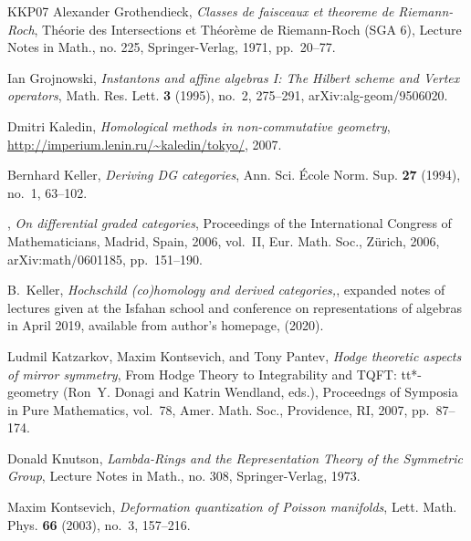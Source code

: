 \documentclass[12pt,a4paper,reqno]{amsart}
\begin{document}
\begin{thebibliography}{KKP07}
Alexander Grothendieck, \emph{Classes de faisceaux et theoreme de
  {R}iemann-{R}och}, Th{\'e}orie des {I}ntersections et {T}h{\'e}or{\`e}me de
  {R}iemann-{R}och (SGA 6), Lecture Notes in Math., no. 225, Springer-Verlag,
  1971, pp.~20--77.

Ian Grojnowski, \emph{Instantons and affine algebras {I}: {T}he {H}ilbert
  scheme and {V}ertex operators}, Math. Res. Lett. \textbf{3} (1995), no.~2,
  275--291, arXiv:alg-geom/9506020.

Dmitri Kaledin, \emph{Homological methods in non-commutative geometry},
  \url{http://imperium.lenin.ru/~kaledin/tokyo/}, 2007.

Bernhard Keller, \emph{Deriving {DG} categories}, Ann. Sci. {\'E}cole Norm.
  Sup. \textbf{27} (1994), no.~1, 63--102.

\bysame, \emph{On differential graded categories}, Proceedings of the
  International Congress of Mathematicians, Madrid, Spain, 2006, vol.~II, Eur.
  Math. Soc., Z{\"u}rich, 2006, arXiv:math/0601185, pp.~151--190.

B.~Keller, \emph{Hochschild (co)homology and derived categories,}, expanded
  notes of lectures given at the Isfahan school and conference on
  representations of algebras in April 2019, available from author's homepage,
  (2020).

Ludmil Katzarkov, Maxim Kontsevich, and Tony Pantev, \emph{Hodge theoretic
  aspects of mirror symmetry}, From Hodge Theory to Integrability and TQFT:
  tt*-geometry (Ron~Y. Donagi and Katrin Wendland, eds.), Proceedngs of
  Symposia in Pure Mathematics, vol.~78, Amer. Math. Soc., Providence, RI,
  2007, pp.~87--174.

Donald Knutson, \emph{{Lambda-Rings and the Representation Theory of the
  Symmetric Group}}, Lecture Notes in Math., no. 308, Springer-Verlag, 1973.

Maxim Kontsevich, \emph{Deformation quantization of {P}oisson manifolds}, Lett.
  Math. Phys. \textbf{66} (2003), no.~3, 157--216.


\end{thebibliography}
\end{document}
